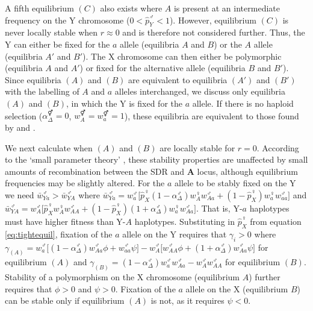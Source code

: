 \documentclass[12pt]{article}
\begin{document}
\noindent
A fifth equilibrium $(C)$ also exists where $A$ is present at an intermediate frequency on the Y chromosome ($0<\hat{p}_{Y}^{\male}<1$). 
However, equilibrium $(C)$ is never locally stable when $r \approx 0$ and is therefore not considered further.
Thus, the Y can either be fixed for the $a$ allele (equilibria $A$ and $B$) or the $A$ allele (equilibria $A'$ and $B'$).
The X chromosome can then either be polymorphic (equilibria $A$ and $A'$) or fixed for the alternative allele (equilibria $B$ and $B'$).
Since equilibria $(A)$ and $(B)$ are equivalent to equilibria $(A')$ and $(B')$ with the labelling of $A$ and $a$ alleles interchanged, we discuss only equilibria $(A)$ and $(B)$, in which the Y is fixed for the $a$ allele. 
If there is no haploid selection ($\alpha^{\Hermaphrodite}_\Delta=0$, $w_{A}^{\Hermaphrodite}=w_{a}^{\Hermaphrodite}=1$), these equilibria are equivalent to those found by \cite{Lloyd1977} and \cite{Otto2014}.

We next calculate when $(A)$ and $(B)$ are locally stable for $r=0$. 
According to the `small parameter theory' \citep{Karlin:1972ab,Karlin:1972dq}, these stability properties are unaffected by small amounts of recombination between the SDR and \textbf{A} locus, although equilibrium frequencies may be slightly altered. 
For the $a$ allele to be stably fixed on the Y we need $\bar{w}_{Ya}^{\male} > \bar{w}_{YA}^{\male}$ where $\bar{w}_{Ya}^{\male} = w_{a}^{\male} \big[\hat{p}_X^\female(1-\alpha^\male_\Delta) w_{A}^{\female} w_{Aa}^{\male} + (1-\hat{p}_X^\female)w_{a}^{\female} w_{aa}^{\male} \big]$ and $\bar{w}_{YA}^{\male} = w_{A}^{\male} \big[ \hat{p}_X^\female w_{A}^{\female} w_{AA}^{\male} + (1-\hat{p}_X^\female)(1+\alpha^\male_\Delta) w_{a}^{\female} w_{Aa}^{\male} \big]$. 
That is, Y-$a$ haplotypes must have higher fitness than Y-$A$ haplotypes.  
Substituting in $\hat{p}_X^\female$ from equation \eqref{eq:tightequil}, fixation of the $a$ allele on the Y requires that $\gamma_{i}>0$ where $\gamma_{(A)}=w_{a}^{\male} \big[ (1-\alpha^\male_\Delta) w_{Aa}^{\male} \phi + w_{aa}^{\male} \psi \big]-w_{A}^{\male} \big[ w_{AA}^{\male} \phi + (1 + \alpha^{\male}_\Delta)w_{Aa}^{\male} \psi \big]$ for equilibrium $(A)$ and $\gamma_{(B)}=(1-\alpha^{\male}_\Delta)w_{a}^{\male}w_{Aa}^{\male}-w_{A}^{\male}w_{AA}^{\male}$ for equilibrium $(B)$.
Stability of a polymorphism on the X chromosome (equilibrium $A$) further requires that $\phi >0$ and $\psi >0$. 
Fixation of the $a$ allele on the X (equilibrium $B$) can be stable only if equilibrium $(A)$ is not, as it requires $\psi<0$. %
\end{document}
